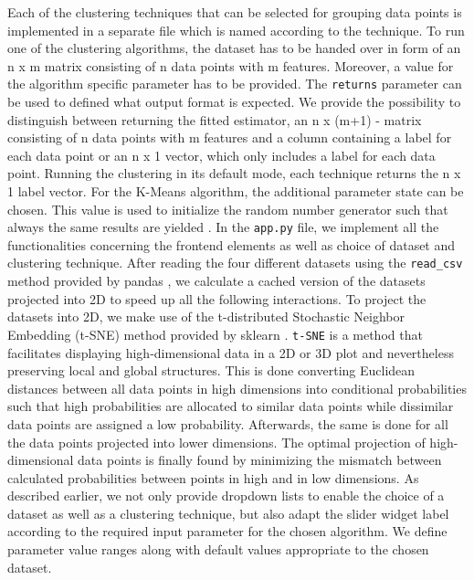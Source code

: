 Each of the clustering techniques that can be selected for grouping data points is implemented in a separate file which is named according to the technique. To run one of the clustering algorithms, the dataset has to be handed over in form of an n x m matrix consisting of n data points with m features. Moreover, a value for the algorithm specific parameter has to be provided. The \texttt{returns} parameter can be used to defined what output format is expected. We provide the possibility to distinguish between returning the fitted estimator, an n x (m+1) - matrix consisting of n data points with m features and a column containing a label for each data point or an n x 1 vector, which only includes a label for each data point. Running the clustering in its default mode, each technique returns the n x 1 label vector.
For the K-Means algorithm, the additional parameter state can be chosen. This value is used to initialize the random number generator such that always the same results are yielded \cite{sklearn_api}.\newline
In the \texttt{app.py} file, we implement all the functionalities concerning the frontend elements as well as choice of dataset and clustering technique. After reading the four different datasets using the \texttt{read_csv} method provided by pandas \cite{reback2020pandas, mckinney-proc-scipy-2010}, we calculate a cached version of the datasets projected into 2D to speed up all the following interactions. 
To project the datasets into 2D, we make use of the t-distributed Stochastic Neighbor Embedding (t-SNE) method provided by sklearn \cite{sklearn_api}. \texttt{t-SNE} is a method that facilitates displaying high-dimensional data in a 2D or 3D plot and nevertheless preserving local and global structures. This is done converting Euclidean distances between all data points in high dimensions into conditional probabilities such that high probabilities are allocated to similar data points while dissimilar data points are assigned a low probability. Afterwards, the same is done for all the data points projected into lower dimensions. The optimal projection of high-dimensional data points is finally found by minimizing the mismatch between calculated probabilities between points in high and in low dimensions\cite{tSNE}.\newline
As described earlier, we not only provide dropdown lists to enable the choice of a dataset as well as a clustering technique, but also adapt the slider widget label according to the required input parameter for the chosen algorithm. We define parameter value ranges along with default values appropriate to the chosen dataset. 
